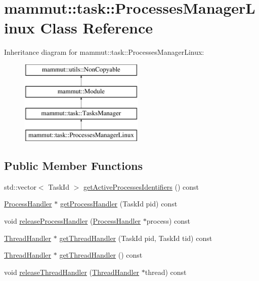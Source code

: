 \hypertarget{classmammut_1_1task_1_1ProcessesManagerLinux}{\section{mammut\-:\-:task\-:\-:Processes\-Manager\-Linux Class Reference}
\label{classmammut_1_1task_1_1ProcessesManagerLinux}
}
Inheritance diagram for mammut\-:\-:task\-:\-:Processes\-Manager\-Linux\-:\begin{figure}[H]
\begin{center}
\leavevmode
\includegraphics[height=4.000000cm]{classmammut_1_1task_1_1ProcessesManagerLinux}
\end{center}
\end{figure}
\subsection*{Public Member Functions}
\begin{DoxyCompactItemize}
\item 
std\-::vector$<$ Task\-Id $>$ \hyperlink{classmammut_1_1task_1_1ProcessesManagerLinux_a462f03471eb2d33aa9c9b356d2cffe59}{get\-Active\-Processes\-Identifiers} () const 
\item 
\hyperlink{classmammut_1_1task_1_1ProcessHandler}{Process\-Handler} $\ast$ \hyperlink{classmammut_1_1task_1_1ProcessesManagerLinux_a3d2102056565bb09e0c15e352a741451}{get\-Process\-Handler} (Task\-Id pid) const 
\item 
void \hyperlink{classmammut_1_1task_1_1ProcessesManagerLinux_afef064167534e4108e6ca33277bbbbb7}{release\-Process\-Handler} (\hyperlink{classmammut_1_1task_1_1ProcessHandler}{Process\-Handler} $\ast$process) const 
\item 
\hyperlink{classmammut_1_1task_1_1ThreadHandler}{Thread\-Handler} $\ast$ \hyperlink{classmammut_1_1task_1_1ProcessesManagerLinux_ad3d15ed36d4deca35e2dd88d304fa301}{get\-Thread\-Handler} (Task\-Id pid, Task\-Id tid) const 
\item 
\hyperlink{classmammut_1_1task_1_1ThreadHandler}{Thread\-Handler} $\ast$ \hyperlink{classmammut_1_1task_1_1ProcessesManagerLinux_ab52208db53ef4ddb0a8b9661ef6b255a}{get\-Thread\-Handler} () const 
\item 
void \hyperlink{classmammut_1_1task_1_1ProcessesManagerLinux_ad9d72966c952c4d2dd1445204d600667}{release\-Thread\-Handler} (\hyperlink{classmammut_1_1task_1_1ThreadHandler}{Thread\-Handler} $\ast$thread) const 
\end{DoxyCompactItemize}


